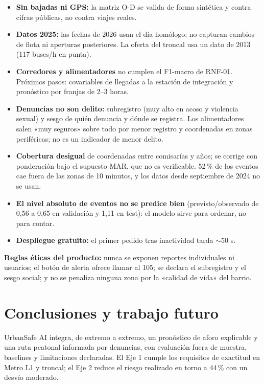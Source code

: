 \documentclass[11pt]{article}
\begin{document}
\begin{itemize}
  \item \textbf{Sin bajadas ni GPS:} la matriz O-D se valida de forma sintética y contra cifras
        públicas, no contra viajes reales.
  \item \textbf{Datos 2025:} las fechas de 2026 usan el día homólogo; no capturan cambios de flota ni
        aperturas posteriores. La oferta del troncal usa un dato de 2013 (117 buses/h en punta).
  \item \textbf{Corredores y alimentadores} no cumplen el F1-macro de RNF-01. Próximos pasos:
        covariables de llegadas a la estación de integración y pronóstico por franjas de 2--3 horas.
  \item \textbf{Denuncias no son delito:} subregistro (muy alto en acoso y violencia sexual) y sesgo
        de quién denuncia y dónde se registra. Los alimentadores salen «muy seguros» sobre todo por
        menor registro y coordenadas en zonas periféricas; no es un indicador de menor delito.
  \item \textbf{Cobertura desigual} de coordenadas entre comisarías y años; se corrige con
        ponderación bajo el supuesto MAR, que no es verificable. 52\,\% de los eventos cae fuera de
        las zonas de 10 minutos, y los datos desde septiembre de 2024 no se usan.
  \item \textbf{El nivel absoluto de eventos no se predice bien} (previsto/observado de 0,56 a 0,65 en
        validación y 1,11 en test): el modelo sirve para ordenar, no para contar.
  \item \textbf{Despliegue gratuito:} el primer pedido tras inactividad tarda $\sim$50 s.
\end{itemize}

\textbf{Reglas éticas del producto:} nunca se exponen reportes individuales ni usuarios; el botón de
alerta ofrece llamar al 105; se declara el subregistro y el sesgo social; y no se penaliza ninguna
zona por la «calidad de vida» del barrio.

\section{Conclusiones y trabajo futuro}

UrbanSafe AI integra, de extremo a extremo, un pronóstico de aforo explicable y una ruta peatonal
informada por denuncias, con evaluación fuera de muestra, baselines y limitaciones declaradas. El
Eje 1 cumple los requisitos de exactitud en Metro L1 y troncal; el Eje 2 reduce el riesgo realizado
en torno a 44\,\% con un desvío moderado.
\end{document}
